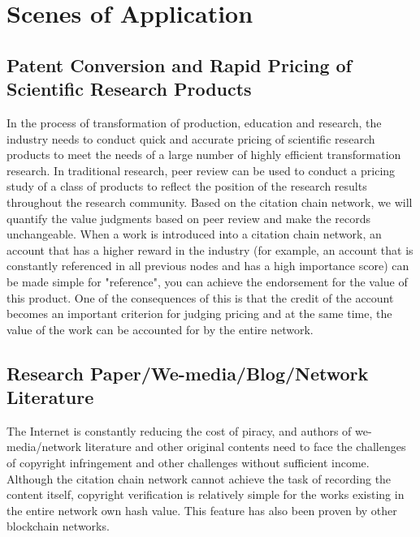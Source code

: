 \documentclass[a4paper,oneside,openany]{tufte-book}
\begin{document}
\chapter{Scenes of Application}


\section{Patent Conversion and Rapid Pricing of Scientific Research Products}


In the process of transformation of production, education and research, the industry needs to conduct quick and accurate pricing of scientific research products to meet the needs of a large number of highly efficient transformation research. In traditional research, peer review can be used to conduct a pricing study of a class of products to reflect the position of the research results throughout the research community. Based on the citation chain network, we will quantify the value judgments based on peer review and make the records unchangeable. When a work is introduced into a citation chain network, an account that has a higher reward in the industry (for example, an account that is constantly referenced in all previous nodes and has a high importance score) can be made simple for "reference", you can achieve the endorsement for the value of this product. One of the consequences of this is that the credit of the account becomes an important criterion for judging pricing and at the same time, the value of the work can be accounted for by the entire network.


\section{Research Paper/We-media/Blog/Network Literature}
The Internet is constantly reducing the cost of piracy, and authors of we-media/network literature and other original contents need to face the challenges of copyright infringement and other challenges without sufficient income. Although the citation chain network cannot achieve the task of recording the content itself, copyright verification is relatively simple for the works existing in the entire network own  hash value. This feature has also been proven by other blockchain networks.
\end{document}
